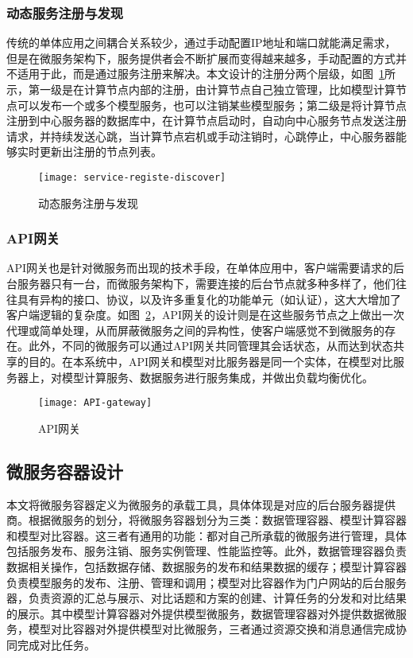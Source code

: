 \subsubsection{动态服务注册与发现}
传统的单体应用之间耦合关系较少，通过手动配置IP地址和端口就能满足需求，但是在微服务架构下，服务提供者会不断扩展而变得越来越多，手动配置的方式并不适用于此，而是通过服务注册来解决。本文设计的注册分两个层级，如图~\ref{fig:service-registe-discover}所示，第一级是在计算节点内部的注册，由计算节点自己独立管理，比如模型计算节点可以发布一个或多个模型服务，也可以注销某些模型服务；第二级是将计算节点注册到中心服务器的数据库中，在计算节点启动时，自动向中心服务节点发送注册请求，并持续发送心跳，当计算节点宕机或手动注销时，心跳停止，中心服务器能够实时更新出注册的节点列表。

\begin{figure}[!htbp]
    \centering
    \texttt{[image: service-registe-discover]}
    \caption{动态服务注册与发现}
    \label{fig:service-registe-discover}
\end{figure}

\subsubsection{API网关}
API网关也是针对微服务而出现的技术手段，在单体应用中，客户端需要请求的后台服务器只有一台，而微服务架构下，需要连接的后台节点就多种多样了，他们往往具有异构的接口、协议，以及许多重复化的功能单元（如认证），这大大增加了客户端逻辑的复杂度。如图~\ref{fig:API-gateway}，API网关的设计则是在这些服务节点之上做出一次代理或简单处理，从而屏蔽微服务之间的异构性，使客户端感觉不到微服务的存在。此外，不同的微服务可以通过API网关共同管理其会话状态，从而达到状态共享的目的。在本系统中，API网关和模型对比服务器是同一个实体，在模型对比服务器上，对模型计算服务、数据服务进行服务集成，并做出负载均衡优化。

\begin{figure}[!htbp]
    \centering
    \texttt{[image: API-gateway]}
    \caption{API网关}
    \label{fig:API-gateway}
\end{figure}

\subsection{微服务容器设计}
本文将微服务容器定义为微服务的承载工具，具体体现是对应的后台服务器提供商。根据微服务的划分，将微服务容器划分为三类：数据管理容器、模型计算容器和模型对比容器。这三者有通用的功能：都对自己所承载的微服务进行管理，具体包括服务发布、服务注销、服务实例管理、性能监控等。此外，数据管理容器负责数据相关操作，包括数据存储、数据服务的发布和结果数据的缓存；模型计算容器负责模型服务的发布、注册、管理和调用；模型对比容器作为门户网站的后台服务器，负责资源的汇总与展示、对比话题和方案的创建、计算任务的分发和对比结果的展示。其中模型计算容器对外提供模型微服务，数据管理容器对外提供数据微服务，模型对比容器对外提供模型对比微服务，三者通过资源交换和消息通信完成协同完成对比任务。
